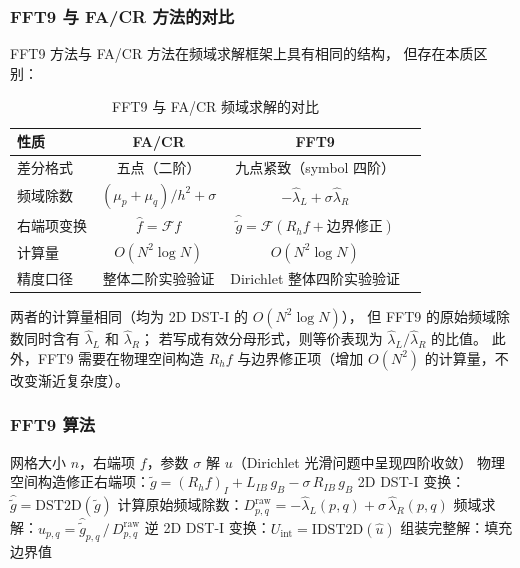 \subsubsection{FFT9 与 FA/CR 方法的对比}

FFT9 方法与 FA/CR 方法在频域求解框架上具有相同的结构，
但存在本质区别：

\begin{table}[H]
\centering
\caption{FFT9 与 FA/CR 频域求解的对比}
\label{tab:fft9_vs_fa}
\begin{tabular}{lccc}
\toprule
性质 & FA/CR & FFT9 \\
\midrule
差分格式 & 五点（二阶） & 九点紧致（symbol 四阶） \\
频域除数 & $(\mu_p+\mu_q)/h^2 + \sigma$ & $-\hat{\lambda}_L+\sigma\hat{\lambda}_R$ \\
右端项变换 & $\hat{f} = \mathcal{F}f$ & $\hat{\tilde{g}} = \mathcal{F}(R_h f + \text{边界修正})$ \\
计算量 & $O(N^2 \log N)$ & $O(N^2 \log N)$ \\
精度口径 & 整体二阶实验验证 & Dirichlet 整体四阶实验验证 \\
\bottomrule
\end{tabular}
\end{table}

两者的计算量相同（均为 2D DST-I 的 $O(N^2 \log N)$），
但 FFT9 的原始频域除数同时含有 $\hat{\lambda}_L$ 和 $\hat{\lambda}_R$；
若写成有效分母形式，则等价表现为 $\hat{\lambda}_L/\hat{\lambda}_R$ 的比值。
此外，FFT9 需要在物理空间构造 $R_h f$ 与边界修正项（增加 $O(N^2)$ 的计算量，不改变渐近复杂度）。

\subsubsection{FFT9 算法}

\begin{algorithm}
\caption{FFT9 四阶紧致差分法求解离散 Poisson/Helmholtz 方程（Dirichlet BC）}
\begin{algorithmic}[1]
\REQUIRE 网格大小 $n$，右端项 $f$，参数 $\sigma$
\ENSURE 解 $u$（Dirichlet 光滑问题中呈现四阶收敛）
\STATE 物理空间构造修正右端项：$\tilde{g} = (R_h f)_I + L_{IB}\,g_B - \sigma\,R_{IB}\,g_B$
\STATE 2D DST-I 变换：$\hat{\tilde{g}} = \mathrm{DST2D}(\tilde{g})$
\STATE 计算原始频域除数：$D_{p,q}^{\mathrm{raw}} = -\hat{\lambda}_L(p,q) + \sigma\,\hat{\lambda}_R(p,q)$
\STATE 频域求解：$\hat{u}_{p,q} = \hat{\tilde{g}}_{p,q} \,/\, D_{p,q}^{\mathrm{raw}}$
\STATE 逆 2D DST-I 变换：$U_{\mathrm{int}} = \mathrm{IDST2D}(\hat{u})$
\STATE 组装完整解：填充边界值
\end{algorithmic}
\end{algorithm}

